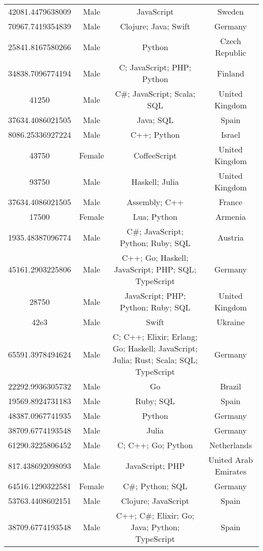 \begin{center}
\begin{tabular}{ |c|c|c|c| }
42081.4479638009  &  Male  &  JavaScript  &  Sweden  \\ 
70967.7419354839  &  Male  &  Clojure; Java; Swift  &  Germany  \\ 
25841.8167580266  &  Male  &  Python  &  Czech Republic  \\ 
34838.7096774194  &  Male  &  C; JavaScript; PHP; Python  &  Finland  \\ 
41250  &  Male  &  C\#; JavaScript; Scala; SQL  &  United Kingdom  \\ 
37634.4086021505  &  Male  &  Java; SQL  &  Spain  \\ 
8086.25336927224  &  Male  &  C++; Python  &  Israel  \\ 
43750  &  Female  &  CoffeeScript  &  United Kingdom  \\ 
93750  &  Male  &  Haskell; Julia  &  United Kingdom  \\ 
37634.4086021505  &  Male  &  Assembly; C++  &  France  \\ 
17500  &  Female  &  Lua; Python  &  Armenia  \\ 
1935.48387096774  &  Male  &  C\#; JavaScript; Python; Ruby; SQL  &  Austria  \\ 
45161.2903225806  &  Male  &  C++; Go; Haskell; JavaScript; PHP; SQL; TypeScript  &  Germany  \\ 
28750  &  Male  &  JavaScript; PHP; Python; Ruby; SQL  &  United Kingdom  \\ 
42e3  &  Male  &  Swift  &  Ukraine  \\ 
65591.3978494624  &  Male  &  C; C++; Elixir; Erlang; Go; Haskell; JavaScript; Julia; Rust; Scala; SQL; TypeScript  &  Germany  \\ 
22292.9936305732  &  Male  &  Go  &  Brazil  \\ 
19569.8924731183  &  Male  &  Ruby; SQL  &  Spain  \\ 
48387.0967741935  &  Male  &  Python  &  Germany  \\ 
38709.6774193548  &  Male  &  Julia  &  Germany  \\ 
61290.3225806452  &  Male  &  C; C++; Go; Python  &  Netherlands  \\ 
817.438692098093  &  Male  &  JavaScript; PHP  &  United Arab Emirates  \\ 
64516.1290322581  &  Female  &  C\#; Python; SQL  &  Germany  \\ 
53763.4408602151  &  Male  &  Clojure; JavaScript  &  Spain  \\ 
38709.6774193548  &  Male  &  C++; C\#; Elixir; Go; Java; Python; TypeScript  &  Spain  \\ 

\end{tabular}
\end{center}
